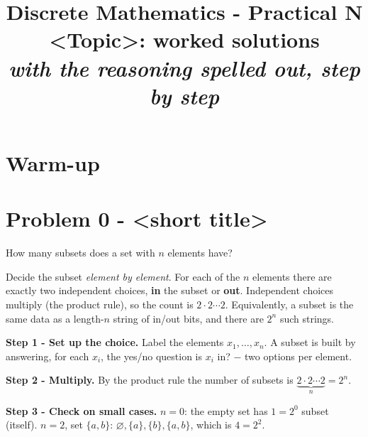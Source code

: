 \documentclass[11pt,a4paper]{article}
\title{\vspace{-1.2cm}\textbf{Discrete Mathematics - Practical N}\\[2pt]
\large <Topic>: worked solutions\\[2pt]
\normalsize\itshape with the reasoning spelled out, step by step}
\author{}
\date{}
\begin{document}
\maketitle
\vspace{-1.0cm}

\section*{Warm-up}

\section*{Problem 0 - <short title>}

\begin{problembox}[0]
How many subsets does a set with $n$ elements have?
\end{problembox}

\begin{ideabox}
Decide the subset \emph{element by element}. For each of the $n$ elements there are exactly two
independent choices, \textbf{in} the subset or \textbf{out}. Independent choices multiply (the
product rule), so the count is $2\cdot2\cdots2$. Equivalently, a subset is the same data as a
length-$n$ string of \textquotedbl{}in/out\textquotedbl{} bits, and there are $2^n$ such strings.
\end{ideabox}

\textbf{Step 1 - Set up the choice.}
Label the elements $x_1,\dots,x_n$. A subset is built by answering, for each $x_i$, the yes/no
question \textquotedbl{}is $x_i$ in?\textquotedbl{} $-$ two options per element.

\textbf{Step 2 - Multiply.}
By the product rule the number of subsets is $\underbrace{2\cdot2\cdots2}_{n}=2^n$.

\textbf{Step 3 - Check on small cases.}
$n=0$: the empty set has $1=2^0$ subset (itself). $n=2$, set $\{a,b\}$: $\varnothing,\{a\},\{b\},\{a,b\}$, which is $4=2^2$. \checkmark
\end{document}

